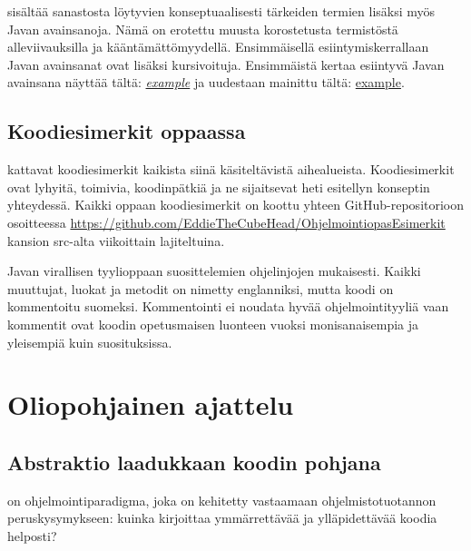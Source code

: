 \documentclass[a4paper,justified,notoc]{tufte-book}
\newcommand{\javanogls}[1]{\underline{#1}}
\newcommand{\newjavanogls}[1]{\textit{\javanogls{#1}}}
\begin{document}
\begin{fullwidth}
 sisältää sanastosta löytyvien konseptuaalisesti tärkeiden termien
lisäksi myös Javan avainsanoja. Nämä on erotettu muusta korostetusta termistöstä alleviivauksilla
ja kääntämättömyydellä. Ensimmäisellä esiintymiskerrallaan Javan avainsanat ovat lisäksi
kursivoituja. Ensimmäistä kertaa esiintyvä Javan avainsana näyttää tältä: \newjavanogls{example}
ja uudestaan mainittu tältä: \javanogls{example}.


\section{Koodiesimerkit oppaassa}
\label{koodiesimerkeistä}

 kattavat koodiesimerkit kaikista siinä käsiteltävistä aihealueista.
Koodiesimerkit ovat lyhyitä, toimivia, koodinpätkiä ja ne sijaitsevat heti esitellyn konseptin
yhteydessä. Kaikki oppaan koodiesimerkit on koottu yhteen GitHub-repositorioon osoitteessa
\url{https://github.com/EddieTheCubeHead/OhjelmointiopasEsimerkit} kansion src-alta viikoittain
lajiteltuina.

 Javan virallisen tyylioppaan suosittelemien
ohjelinjojen mukaisesti. Kaikki muuttujat, luokat ja metodit on nimetty englanniksi, mutta koodi
on kommentoitu suomeksi. Kommentointi ei noudata hyvää ohjelmointityyliä vaan kommentit ovat
koodin opetusmaisen luonteen vuoksi monisanaisempia ja yleisempiä kuin suosituksissa.


\mainmatter
\chapter{Oliopohjainen ajattelu}
\label{olioista}

\section{Abstraktio laadukkaan koodin pohjana}
\label{abstraktiosta}

 on ohjelmointiparadigma, joka on kehitetty vastaamaan
ohjelmistotuotannon peruskysymykseen: kuinka kirjoittaa ymmärrettävää ja ylläpidettävää koodia
helposti?


\end{fullwidth}
\end{document}
